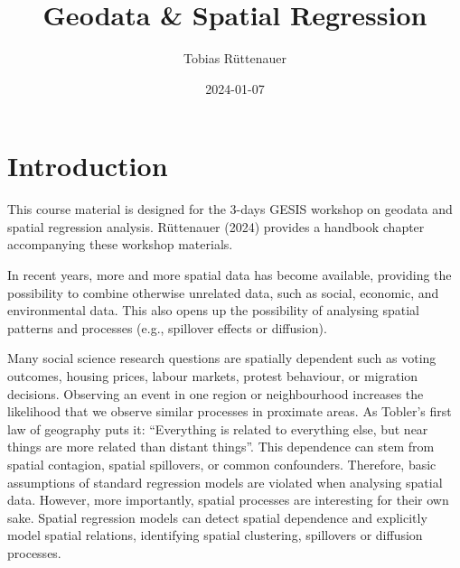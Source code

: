 \documentclass[
  letterpaper,
  DIV=11,
  numbers=noendperiod]{scrreprt}
\title{Geodata \& Spatial Regression}
\author{Tobias Rüttenauer}
\date{2024-01-07}
\renewcommand*\contentsname{Table of contents}
\newcommand\contentsname{Table of contents}
\begin{document}
\maketitle
\ifdefined\Shaded\renewenvironment{Shaded}{\begin{tcolorbox}[frame hidden, sharp corners, borderline west={3pt}{0pt}{shadecolor}, breakable, interior hidden, boxrule=0pt, enhanced]}{\end{tcolorbox}}\fi

\renewcommand*\contentsname{Table of contents}
{
\hypersetup{linkcolor=}
\setcounter{tocdepth}{2}
\tableofcontents
}

\hypertarget{introduction}{%
\chapter*{Introduction}\label{introduction}}


This course material is designed for the 3-days GESIS workshop on
geodata and spatial regression analysis. Rüttenauer (2024) provides a
handbook chapter accompanying these workshop materials.

In recent years, more and more spatial data has become available,
providing the possibility to combine otherwise unrelated data, such as
social, economic, and environmental data. This also opens up the
possibility of analysing spatial patterns and processes (e.g., spillover
effects or diffusion).

Many social science research questions are spatially dependent such as
voting outcomes, housing prices, labour markets, protest behaviour, or
migration decisions. Observing an event in one region or neighbourhood
increases the likelihood that we observe similar processes in proximate
areas. As Tobler's first law of geography puts it: ``Everything is
related to everything else, but near things are more related than
distant things''. This dependence can stem from spatial contagion,
spatial spillovers, or common confounders. Therefore, basic assumptions
of standard regression models are violated when analysing spatial data.
However, more importantly, spatial processes are interesting for their
own sake. Spatial regression models can detect spatial dependence and
explicitly model spatial relations, identifying spatial clustering,
spillovers or diffusion processes.
\end{document}
